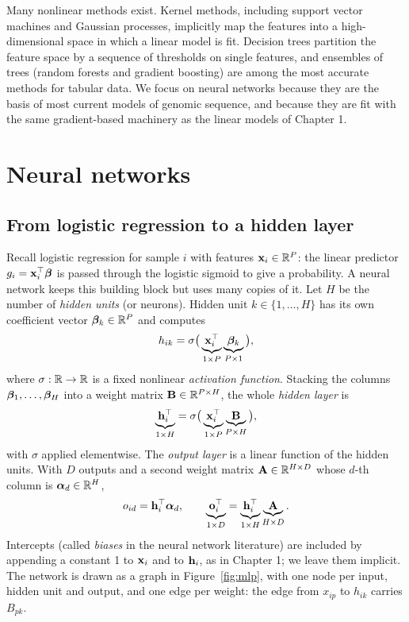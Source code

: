 Many nonlinear methods exist. Kernel methods, including support vector machines and Gaussian processes, implicitly map the features into a high-dimensional space in which a linear model is fit. Decision trees partition the feature space by a sequence of thresholds on single features, and ensembles of trees (random forests and gradient boosting) are among the most accurate methods for tabular data. We focus on neural networks because they are the basis of most current models of genomic sequence, and because they are fit with the same gradient-based machinery as the linear models of Chapter 1.

\section{Neural networks}
\label{sec:mlp}

\subsection{From logistic regression to a hidden layer}

Recall logistic regression for sample $i$ with features $\mathbf{x}_i\in\mathbb{R}^P$: the linear predictor $g_i=\mathbf{x}_i^\top\boldsymbol{\beta}$ is passed through the logistic sigmoid to give a probability. A neural network keeps this building block but uses many copies of it. Let $H$ be the number of \emph{hidden units} (or neurons). Hidden unit $k\in\{1,\dots,H\}$ has its own coefficient vector $\boldsymbol{\beta}_k\in\mathbb{R}^P$ and computes
\begin{equation}
  h_{ik} = \sigma\big(\underbrace{\mathbf{x}_i^\top}_{1\times P}\underbrace{\boldsymbol{\beta}_k}_{P\times1}\big),
\end{equation}
where $\sigma:\mathbb{R}\to\mathbb{R}$ is a fixed nonlinear \emph{activation function}. Stacking the columns $\boldsymbol{\beta}_1,\dots,\boldsymbol{\beta}_H$ into a weight matrix $\mathbf{B}\in\mathbb{R}^{P\times H}$, the whole \emph{hidden layer} is
\begin{equation}
  \underbrace{\mathbf{h}_i^\top}_{1\times H} = \sigma\big(\underbrace{\mathbf{x}_i^\top}_{1\times P}\underbrace{\mathbf{B}}_{P\times H}\big),
  \label{eq:hidden}
\end{equation}
with $\sigma$ applied elementwise. The \emph{output layer} is a linear function of the hidden units. With $D$ outputs and a second weight matrix $\mathbf{A}\in\mathbb{R}^{H\times D}$ whose $d$-th column is $\boldsymbol{\alpha}_d\in\mathbb{R}^H$,
\begin{equation}
  o_{id} = \mathbf{h}_i^\top\boldsymbol{\alpha}_d, \qquad \underbrace{\mathbf{o}_i^\top}_{1\times D} = \underbrace{\mathbf{h}_i^\top}_{1\times H}\underbrace{\mathbf{A}}_{H\times D}.
  \label{eq:output}
\end{equation}
Intercepts (called \emph{biases} in the neural network literature) are included by appending a constant 1 to $\mathbf{x}_i$ and to $\mathbf{h}_i$, as in Chapter 1; we leave them implicit. The network is drawn as a graph in Figure~\ref{fig:mlp}, with one node per input, hidden unit and output, and one edge per weight: the edge from $x_{ip}$ to $h_{ik}$ carries $B_{pk}$.

